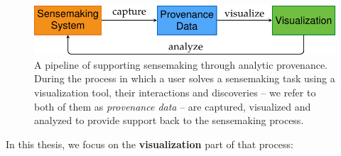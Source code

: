 
\begin{figure}[!htb]
	\centering
	\includegraphics{workflow}
	\caption{A pipeline of supporting sensemaking through analytic provenance. During the process in which a user solves a sensemaking task using a visualization tool, their interactions and discoveries -- we refer to both of them as \emph{provenance data} -- are captured, visualized and analyzed to provide support back to the sensemaking process.}
	\label{fig:workflow}
\end{figure}

In this thesis, we focus on the \textbf{visualization} part of that process:
\begin{center}
\end{center}

